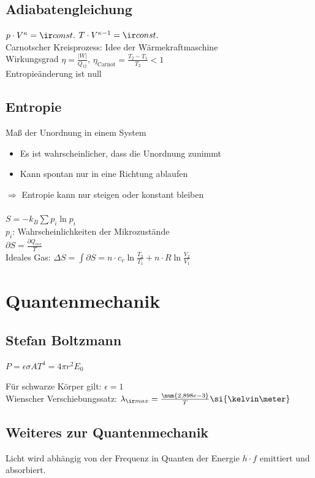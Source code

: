 \documentclass[german]{latex4ei/latex4ei_sheet}
\begin{document}
\subsection{Adiabatengleichung}
$p\cdot V^\kappa = \ir const.$ \qquad $T\cdot V^{\kappa -1} = \ir const.$ \\
Carnotscher Kreisprozess: Idee der Wärmekraftmaschine\\
Wirkungsgrad $\eta = \frac{\vert W\vert}{Q_{12}}$, $\eta_{\text{Carnot}} = \frac{T_2-T_1}{T_2} < 1$\\
Entropieänderung ist null

\subsection{Entropie}
Maß der Unordnung in einem System
\begin{itemize}
	\item Es ist wahrscheinlicher, dass die Unordnung zunimmt
	\item Kann spontan nur in eine Richtung ablaufen
\end{itemize}
$\Rightarrow$ Entropie kann nur steigen oder konstant bleiben\\ \\

$S=-k_B\sum p_i \ln p_i$ \\ 
$p_i$: Wahrscheinlichkeiten der Mikrozustände\\
$\partial S = \frac{\partial Q_{rev}}{T}$\\
Ideales Gas: $\Delta S= \int \partial S = n \cdot c_v \ln \frac{T_2}{T_1}+n\cdot R \ln \frac{V_2}{V_1}$



\section{Quantenmechanik}
\subsection{Stefan Boltzmann}
\begin{emphbox}
$P=\epsilon \sigma A T^4 = 4 \pi r^2 E_0$
\end{emphbox}
Für schwarze Körper gilt: $\epsilon = 1$\\
Wienscher Verschiebungssatz: $\lambda_{\ir max}=\frac{\num{2,898e-3}}{T} \si{\kelvin \meter}$
\subsection{Weiteres zur Quantenmechanik}
Licht wird abhängig von der Frequenz in Quanten der Energie $h\cdot f$ emittiert und absorbiert.
\end{document}
